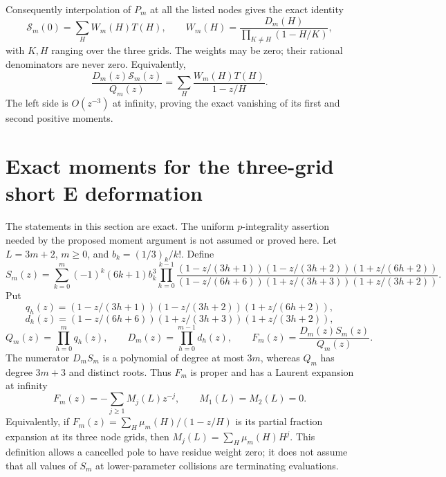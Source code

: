 \documentclass[11pt,letterpaper]{article}
\numberwithin{equation}{section}
\begin{document}
Consequently interpolation of $P_m$ at all the listed nodes gives
the exact identity
\[
 \mathcal S_m(0)=\sum_H W_m(H)T(H),\qquad
 W_m(H)=\frac{D_m(H)}{\prod_{K\ne H}(1-H/K)},
\]
with $K,H$ ranging over the three grids. The weights may be zero;
their rational denominators are never zero.
Equivalently,
\[
 \frac{D_m(z)\mathcal S_m(z)}{Q_m(z)}
 =\sum_H\frac{W_m(H)T(H)}{1-z/H}.
\]
The left side is $O(z^{-3})$ at infinity, proving the exact
vanishing of its first and second positive moments.

\section{Exact moments for the three-grid short E deformation}\label{loc-VIII-3}
\label{VIII-sec:e-three-grid-moments}
The statements in this section are exact. The uniform $p$-integrality
assertion needed by the proposed moment argument is not assumed or
proved here.
Let $L=3m+2$, $m\ge0$, and $b_k=(1/3)_k/k!$. Define
\[
 S_m(z)=\sum_{k=0}^m(-1)^k(6k+1)b_k^3
 \prod_{h=0}^{k-1}
 \frac{(1-z/(3h+1))(1-z/(3h+2))(1+z/(6h+2))}
 {(1-z/(6h+6))(1+z/(3h+3))(1+z/(3h+2))}.
\]
Put
\[
 q_h(z)=(1-z/(3h+1))(1-z/(3h+2))(1+z/(6h+2)),
\]
\[
 d_h(z)=(1-z/(6h+6))(1+z/(3h+3))(1+z/(3h+2)),
\]
\[
 Q_m(z)=\prod_{h=0}^m q_h(z),\qquad
 D_m(z)=\prod_{h=0}^{m-1}d_h(z),\qquad
 F_m(z)=\frac{D_m(z)S_m(z)}{Q_m(z)}.
\]
The numerator $D_mS_m$ is a polynomial of degree at most $3m$,
whereas $Q_m$ has degree $3m+3$ and distinct roots. Thus $F_m$ is
proper and has a Laurent expansion at infinity
\[
 F_m(z)=-\sum_{j\ge1}M_j(L)z^{-j},\qquad M_1(L)=M_2(L)=0.
\]
Equivalently, if $F_m(z)=\sum_H\mu_m(H)/(1-z/H)$ is its partial
fraction expansion at its three node grids, then
$M_j(L)=\sum_H\mu_m(H)H^j$. This definition allows a cancelled pole
to have residue weight zero; it does not assume that all values of
$S_m$ at lower-parameter collisions are terminating evaluations.
\end{document}

